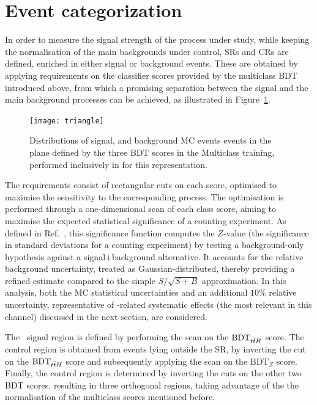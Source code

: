 \section{Event categorization}
\label{sec:tth_categories}

In order to measure the signal strength of the process under study, while keeping the normalisation of the main backgrounds under control, SRs and CRs are defined, enriched in either signal or background events. These are obtained by applying requirements on the classifier scores provided by the multiclass BDT introduced above, from which a promising separation between the signal and the main background processes can be achieved, as illustrated in Figure~\ref{fig:triangle}.

\begin{figure}[htbp]
  \centering
  \texttt{[image: triangle]}
  \caption{Distributions of signal, \ztautau and \ttbar background MC events events in the plane defined by the three BDT scores in the Multiclass training, performed inclusively in \pth for this representation.}
  \label{fig:triangle}
\end{figure}

The requirements consist of rectangular cuts on each score, optimised to maximise the sensitivity to the corresponding process. The optimisation is performed through a one-dimensional scan of each class score, aiming to maximise the expected statistical significance of a counting experiment. As defined in Ref.~\cite{ATL-PHYS-PUB-2020-025}, this significance function computes the $Z$-value (the significance in standard deviations for a counting experiment) by testing a background-only hypothesis against a signal+background alternative. It accounts for the relative background uncertainty, treated as Gaussian-distributed, thereby providing a refined estimate compared to the simple $S/\sqrt{S+B}$ approximation. In this analysis, both the MC statistical uncertainties and an additional $10\%$ relative uncertainty, representative of \ttbar-related systematic effects (the most relevant in this channel) discussed in the next section, are considered.

The \ttH\ signal region is defined by performing the scan on the $\text{BDT}_{\text{\ensuremath{t\overline{t}H}}}$ score. The \ztautau control region is obtained from events lying outside the \ttH SR, by inverting the cut on the $\text{BDT}_{\text{\ensuremath{t\overline{t}H}}}$ score and subsequently applying the scan on the $\text{BDT}_{Z}$ score. Finally, the \ttbar control region is determined by inverting the cuts on the other two BDT scores, resulting in three orthogonal regions, taking advantage of the the normalisation of the multiclass scores mentioned before.

